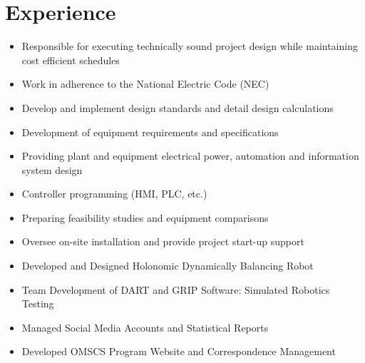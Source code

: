\documentclass[10.5pt,letterpaper,sans]{moderncv}        %
\begin{document}
\makecvtitle

\vspace{-15mm}

\section{Experience}

\begin{itemize}
\item Responsible for executing technically sound project design while maintaining cost efficient schedules
\item Work in adherence to the National Electric Code (NEC)
\item Develop and implement design standards and detail design calculations
\item Development of equipment requirements and specifications
\item Providing plant and equipment electrical power, automation and information system design
\item Controller programming (HMI, PLC, etc.)
\item Preparing feasibility studies and equipment comparisons
\item Oversee on-site installation and provide project start-up support
\end{itemize}

\begin{itemize}
\item Developed and Designed Holonomic Dynamically Balancing Robot
\item Team Development of DART and GRIP Software: Simulated Robotics Testing
\end{itemize}

\begin{itemize}
\item Managed Social Media Accounts and Statistical Reports
\item Developed OMSCS Program Website and Correspondence Management
\end{itemize}

\end{document}
